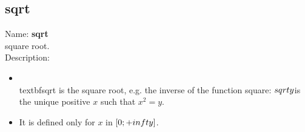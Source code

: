 \subsection{sqrt}
\label{labsqrt}
\noindent Name: \textbf{sqrt}\\
square root.\\
\noindent Description: \begin{itemize}

\item \\textbf{sqrt} is the square root, e.g. the inverse of the function square: $\\sqrt{y}$\n   is the unique positive $x$ such that $x^2=y$.\n
\item It is defined only for $x$ in $[0;+\\infty]$.\n\end{itemize}
